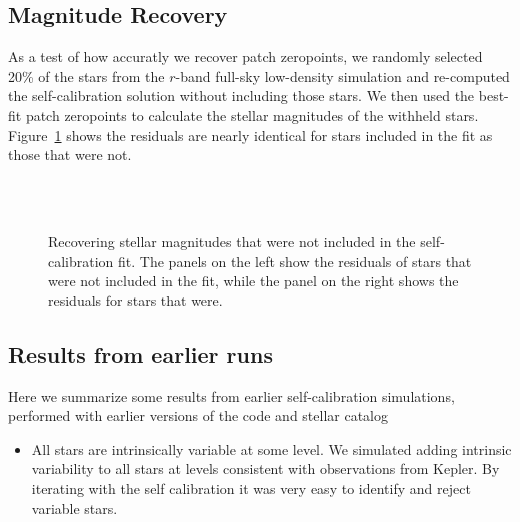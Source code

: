 \documentclass[12pt,preprint]{aastex}
\begin{document}



\subsection{Magnitude Recovery}
As a test of how accuratly we recover patch zeropoints, we randomly selected 20\% of the stars from the $r$-band full-sky low-density simulation and re-computed the self-calibration solution without including those stars.  We then used the best-fit patch zeropoints to calculate the stellar magnitudes of the withheld stars.  Figure~\ref{fig:zpcheck} shows the residuals are nearly identical for stars included in the fit as those that were not.  


\begin{figure}
 \\
 \\
\caption{Recovering stellar magnitudes that were not included in the self-calibration fit.  The panels on the left show the residuals of stars that were not included in the fit, while the panel on the right shows the residuals for stars that were.  \label{fig:zpcheck}}
\end{figure}


\subsection{Results from earlier runs}
Here we summarize some results from earlier self-calibration simulations, performed with earlier versions of the code and stellar catalog

\begin{itemize}
\item{All stars are intrinsically variable at some level.  We simulated adding intrinsic variability to all stars at levels consistent with observations from Kepler.  By iterating with the self calibration it was very easy to identify and reject variable stars.}
\end{itemize}
\end{document}
